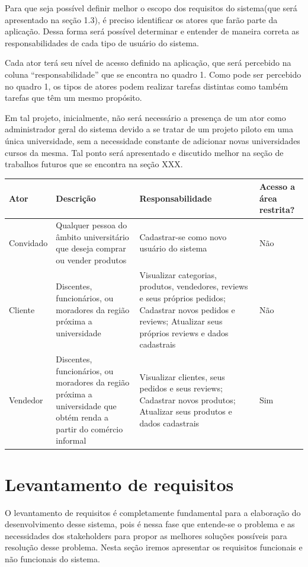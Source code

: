 Para que seja possível definir melhor o escopo dos requisitos do sistema(que será apresentado na seção 1.3), é preciso identificar os atores que farão parte da aplicação. Dessa forma será possível determinar e entender de maneira correta as responsabilidades de cada tipo de usuário do sistema. \par
Cada ator terá seu nível de acesso definido na aplicação, que será percebido na coluna “responsabilidade” que se encontra no quadro 1. Como pode ser percebido no quadro 1, os tipos de atores podem realizar tarefas distintas como também tarefas que têm um mesmo propósito. \par
Em tal projeto, inicialmente, não será necessário a presença de um ator como administrador geral do sistema devido a se tratar de um projeto piloto em uma única universidade, sem a necessidade constante de adicionar novas universidades cursos da mesma. Tal ponto será apresentado e discutido melhor na seção de trabalhos futuros que se encontra na seção XXX.

\begin{tabularx}{0.9\textwidth} { 
  | >{\raggedright\arraybackslash}X 
  | >{\raggedright\arraybackslash}X 
  | >{\raggedright\arraybackslash}X 
  | >{\raggedright\arraybackslash}X | }
 \hline
 Ator & Descrição & Responsabilidade & Acesso a área restrita? \\
 \hline
 Convidado  & Qualquer pessoa do âmbito universitário que deseja comprar ou vender produtos  & Cadastrar-se como novo usuário do sistema & Não  \\
\hline
Cliente & Discentes, funcionários, ou moradores da região próxima a universidade & Visualizar categorias, produtos, vendedores, reviews e seus próprios pedidos; Cadastrar novos pedidos e reviews; Atualizar seus próprios reviews e dados cadastrais & Não \\
\hline
Vendedor & Discentes, funcionários, ou moradores da região próxima a universidade que obtém renda a partir do comércio informal & Visualizar clientes, seus pedidos e seus reviews; Cadastrar novos produtos; Atualizar seus produtos e dados cadastrais & Sim \\
\hline
\end{tabularx}

\section{Levantamento de requisitos}

O levantamento de requisitos é completamente fundamental para a elaboração do desenvolvimento desse sistema, pois é nessa fase que entende-se o problema e as necessidades dos stakeholders para propor as melhores soluções possíveis para resolução desse problema. Nesta seção iremos apresentar os requisitos funcionais e não funcionais do sistema.

